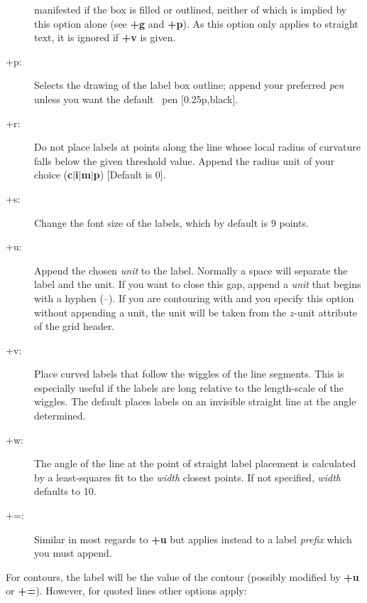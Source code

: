 \begin{description}
manifested if the box is filled or outlined, neither of which is implied by this option alone (see {\bf +g}
and {\bf +p}).  As this option only applies to straight text, it is ignored if {\bf +v} is given.
\item [+p:] Selects the drawing of the label box outline; append your preferred {\it pen} unless you
want the default \GMT\ pen [0.25p,black].
\item [+r:] Do not place labels at points along the line whose local radius of curvature falls below
the given threshold value.  Append the radius unit of your choice ({\bf c$|$i$|$m$|$p}) [Default is 0].
\item [+s:] Change the font size of the labels, which by default is 9 points.
\item [+u:] Append the chosen {\it unit} to the label.  Normally a space will separate the label
and the unit.  If you want to close this gap, append a {\it unit} that begins with a hyphen (--).
If you are contouring with  and you specify this option without appending a unit, the unit will be taken from the
$z$-unit attribute of the grid header.
\item [+v:]  Place curved labels that follow the wiggles of the line segments.  This is especially
useful if the labels are long relative to the length-scale of the wiggles.  The default places labels
on an invisible straight line at the angle determined.
\item [+w:] The angle of the line at the point of straight label placement is calculated by a least-squares
fit to the {\it width} closest points.  If not specified, {\it width} defaults to 10.
\item [+=:]  Similar in most regards to {\bf +u} but applies instead to a label \emph{prefix} which
you must append.
\end{description}
For contours, the label will be the value of the contour (possibly modified by {\bf +u} or {\bf +=}).
However, for quoted lines other options apply:

